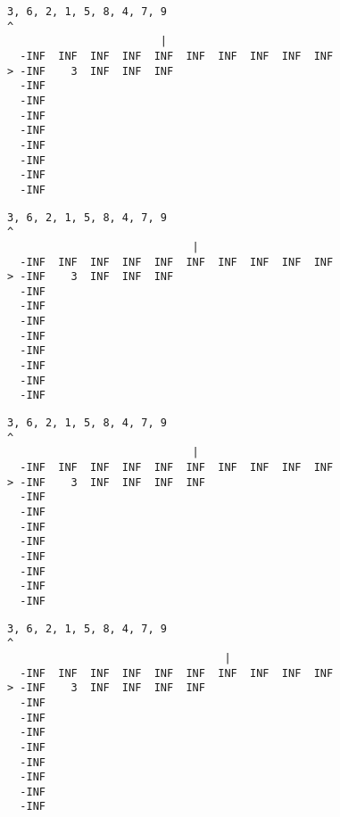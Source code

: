 { \begin{verbatim}
3, 6, 2, 1, 5, 8, 4, 7, 9
^
                        |
  -INF  INF  INF  INF  INF  INF  INF  INF  INF  INF
> -INF    3  INF  INF  INF                         
  -INF                                             
  -INF                                             
  -INF                                             
  -INF                                             
  -INF                                             
  -INF                                             
  -INF                                             
  -INF                                             
\end{verbatim} }

{ \begin{verbatim}
3, 6, 2, 1, 5, 8, 4, 7, 9
^
                             |
  -INF  INF  INF  INF  INF  INF  INF  INF  INF  INF
> -INF    3  INF  INF  INF                         
  -INF                                             
  -INF                                             
  -INF                                             
  -INF                                             
  -INF                                             
  -INF                                             
  -INF                                             
  -INF                                             
\end{verbatim} }

{ \begin{verbatim}
3, 6, 2, 1, 5, 8, 4, 7, 9
^
                             |
  -INF  INF  INF  INF  INF  INF  INF  INF  INF  INF
> -INF    3  INF  INF  INF  INF                    
  -INF                                             
  -INF                                             
  -INF                                             
  -INF                                             
  -INF                                             
  -INF                                             
  -INF                                             
  -INF                                             
\end{verbatim} }

{ \begin{verbatim}
3, 6, 2, 1, 5, 8, 4, 7, 9
^
                                  |
  -INF  INF  INF  INF  INF  INF  INF  INF  INF  INF
> -INF    3  INF  INF  INF  INF                    
  -INF                                             
  -INF                                             
  -INF                                             
  -INF                                             
  -INF                                             
  -INF                                             
  -INF                                             
  -INF                                             
\end{verbatim} }

